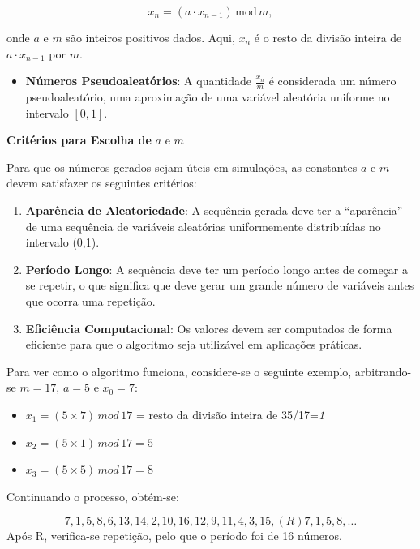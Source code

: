 \documentclass[
]{book}
\providecommand{\tightlist}{%
  \setlength{\itemsep}{0pt}\setlength{\parskip}{0pt}}
\begin{document}
\[x_n = (a \cdot x_{n-1}) \, \text{mod} \, m,\]

onde \(a\) e \(m\) são inteiros positivos dados. Aqui, \(x_n\) é o resto da
divisão inteira de \(a \cdot x_{n-1}\) por \(m\).

\begin{itemize}
\tightlist
\item
  \textbf{Números Pseudoaleatórios}: A quantidade \(\frac{x_n}{m}\) é
  considerada um número pseudoaleatório, uma aproximação de uma
  variável aleatória uniforme no intervalo \([0,1]\).
\end{itemize}

\textbf{Critérios para Escolha de} \(a\) e \(m\)

Para que os números gerados sejam úteis em simulações, as constantes \(a\)
e \(m\) devem satisfazer os seguintes critérios:

\begin{enumerate}
\def\labelenumi{\arabic{enumi}.}
\tightlist
\item
  \textbf{Aparência de Aleatoriedade}: A sequência gerada deve ter a
  ``aparência'' de uma sequência de variáveis aleatórias uniformemente
  distribuídas no intervalo (0,1).
\item
  \textbf{Período Longo}: A sequência deve ter um período longo antes de
  começar a se repetir, o que significa que deve gerar um grande
  número de variáveis antes que ocorra uma repetição.
\item
  \textbf{Eficiência Computacional}: Os valores devem ser computados de
  forma eficiente para que o algoritmo seja utilizável em aplicações
  práticas.
\end{enumerate}

Para ver como o algoritmo funciona, considere-se o seguinte exemplo, arbitrando-se \(m=17\), \(a=5\) e \(x_0=7\):

\begin{itemize}
\tightlist
\item
  \(x_1 = (5\times 7) \, mod \, 17\) = resto da divisão inteira de 35/17=\emph{1}
\item
  \(x_2 = (5 \times 1)\, mod \, 17= 5\)
\item
  \(x_3 = (5 \times 5)\, mod \, 17= 8\)
\end{itemize}

Continuando o processo, obtém-se:

\[7, 1, 5, 8, 6, 13, 14, 2, 10, 16, 12, 9, 11, 4, 3, 15, (R) 7, 1, 5, 8,\ldots\]
Após R, verifica-se repetição, pelo que o período foi de 16 números.
\end{document}
